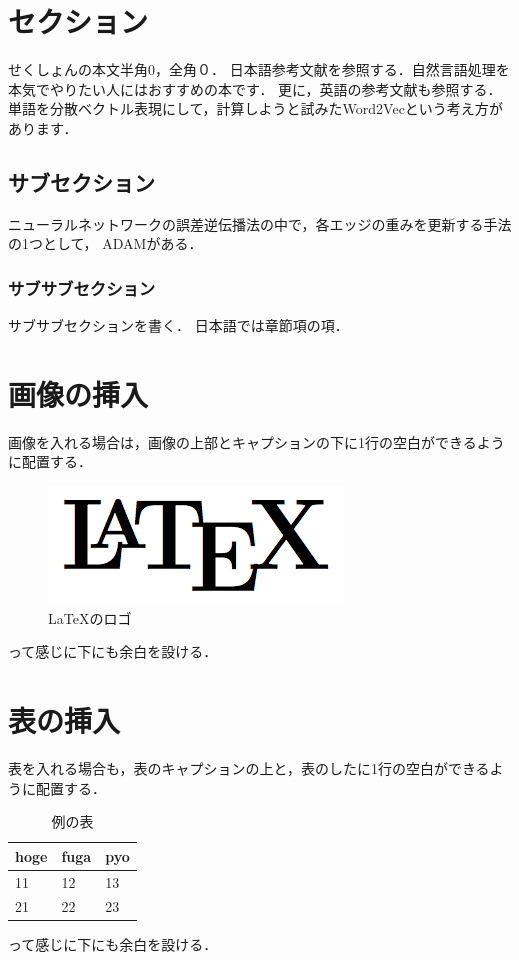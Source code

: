 \documentclass[10pt, a4j, uplatex, twocolumn]{jsarticle}
\begin{document}


\section{セクション}
せくしょんの本文半角0，全角０．
日本語参考文献を参照する．自然言語処理を本気でやりたい人にはおすすめの本\cite{Natural_Language_Processing_by_Deep_Learning}です．
更に，英語の参考文献も参照する．単語を分散ベクトル表現にして，計算しようと試みたWord2Vecという考え方\cite{Mikolov_word2vec}があります．
\subsection{サブセクション}
ニューラルネットワークの誤差逆伝播法の中で，各エッジの重みを更新する手法の1つとして，
ADAM\cite{ADAM}がある．

\subsubsection{サブサブセクション}
サブサブセクションを書く．
日本語では章節項の項．

\section{画像の挿入}
画像を入れる場合は，画像の上部とキャプションの下に1行の空白ができるように配置する．
\begin{figure}[H]
    \centering
    \includegraphics[width=0.8\linewidth]{latex-logo.png}
    \caption{LaTeXのロゴ}
    \label{fig:latex}
\end{figure}
って感じに下にも余白を設ける．
\section{表の挿入}
\lipsum[1]
表を入れる場合も，表のキャプションの上と，表のしたに1行の空白ができるように配置する．
\begin{table}[H]
\centering
\caption{例の表}
\label{tab:example}
\begin{tabular}{@{}lll@{}}
\toprule
hoge & fuga & pyo \\
\midrule
11   & 12   & 13  \\
21   & 22   & 23 \\
\bottomrule
\end{tabular}
\end{table}
って感じに下にも余白を設ける．
\end{document}
